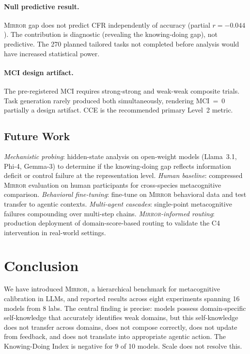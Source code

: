 \documentclass[10pt]{article}
\newcommand{\mirror}{\textsc{Mirror}}
\newcommand{\MCI}{MCI}
\newcommand{\CCE}{CCE}
\newcommand{\CFR}{CFR}
\begin{document}
\paragraph{Null predictive result.}
\mirror{} gap does not predict \CFR{} independently of accuracy
(partial $r = -0.044$). The contribution is diagnostic (revealing the
knowing-doing gap), not predictive. The 270 planned tailored tasks not completed
before analysis would have increased statistical power.

\paragraph{\MCI{} design artifact.}
The pre-registered \MCI{} requires strong-strong and weak-weak composite trials.
Task generation rarely produced both simultaneously, rendering \MCI{}~=~0 partially
a design artifact. \CCE{} is the recommended primary Level~2 metric.

\subsection{Future Work}

\textit{Mechanistic probing}: hidden-state analysis on open-weight models
(Llama~3.1, Phi-4, Gemma-3) to determine if the knowing-doing gap reflects
information deficit or control failure at the representation level.
\textit{Human baseline}: compressed \mirror{} evaluation on human participants for
cross-species metacognitive comparison.
\textit{Behavioral fine-tuning}: fine-tune on \mirror{} behavioral data and test
transfer to agentic contexts.
\textit{Multi-agent cascades}: single-point metacognitive failures compounding
over multi-step chains.
\textit{\mirror{}-informed routing}: production deployment of domain-score-based
routing to validate the C4 intervention in real-world settings.

\section{Conclusion}
\label{sec:conclusion}

We have introduced \mirror{}, a hierarchical benchmark for metacognitive
calibration in LLMs, and reported results across eight experiments spanning 16
models from 8 labs. The central finding is precise: models possess domain-specific
self-knowledge that accurately identifies weak domains, but this self-knowledge
does not transfer across domains, does not compose correctly, does not update from
feedback, and does not translate into appropriate agentic action. The Knowing-Doing
Index is negative for 9 of 10 models. Scale does not resolve this.
\end{document}
